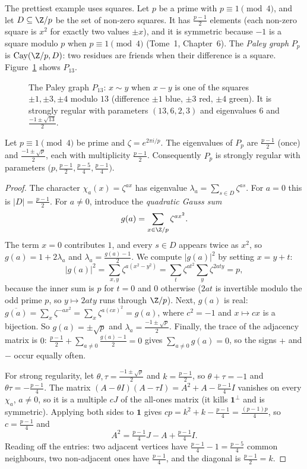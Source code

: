 The prettiest example uses squares. Let $p$ be a prime with $p\equiv1\pmod4$, and let $D\subseteq\Z/p$ be the set of non-zero
squares. It has $\frac{p-1}2$ elements (each non-zero square is $x^2$ for exactly two values $\pm x$), and it is symmetric because
$-1$ is a square modulo $p$ when $p\equiv1\pmod4$ (Tome~1, Chapter~6). The \emph{Paley graph} $P_p$ is $\operatorname{Cay}(\Z/p,D)$:
two residues are friends when their difference is a square. Figure~\ref{fig:paley} shows $P_{13}$.

\begin{figure}[ht]
\centering
{}
\caption{The Paley graph $P_{13}$: $x\sim y$ when $x-y$ is one of the squares $\pm1,\pm3,\pm4$ modulo $13$ (difference $\pm1$ blue,
$\pm3$ red, $\pm4$ green). It is strongly regular with parameters $(13,6,2,3)$ and eigenvalues $6$ and $\frac{-1\pm\sqrt{13}}2$.}
\label{fig:paley}
\end{figure}

\begin{theorem}\label{thm:paley}
Let $p\equiv1\pmod4$ be prime and $\zeta=e^{2\pi i/p}$. The eigenvalues of $P_p$ are $\frac{p-1}2$ (once) and $\frac{-1\pm\sqrt p}2$,
each with multiplicity $\frac{p-1}2$. Consequently $P_p$ is strongly regular with parameters $\bigl(p,\frac{p-1}2,\frac{p-5}4,
\frac{p-1}4\bigr)$.
\end{theorem}
\begin{proof}
The character $\chi_a(x)=\zeta^{ax}$ has eigenvalue $\lambda_a=\sum_{s\in D}\zeta^{as}$. For $a=0$ this is $|D|=\frac{p-1}2$. For
$a\ne0$, introduce the \emph{quadratic Gauss sum}
\[
g(a)=\sum_{x\in\Z/p}\zeta^{ax^2}.
\]
The term $x=0$ contributes $1$, and every $s\in D$ appears twice as $x^2$, so $g(a)=1+2\lambda_a$ and $\lambda_a=\frac{g(a)-1}2$.
We compute $|g(a)|^2$ by setting $x=y+t$:
\[
|g(a)|^2=\sum_{x,y}\zeta^{a(x^2-y^2)}=\sum_t\zeta^{at^2}\sum_y\zeta^{2aty}=p,
\]
because the inner sum is $p$ for $t=0$ and $0$ otherwise ($2at$ is invertible modulo the odd prime $p$, so $y\mapsto2aty$ runs
through $\Z/p$). Next, $g(a)$ is real: $\overline{g(a)}=\sum_x\zeta^{-ax^2}=\sum_x\zeta^{a(cx)^2}=g(a)$, where $c^2=-1$ and
$x\mapsto cx$ is a bijection. So $g(a)=\pm\sqrt p$ and $\lambda_a=\frac{-1\pm\sqrt p}2$. Finally, the trace of the adjacency matrix
is $0$: $\frac{p-1}2+\sum_{a\ne0}\frac{g(a)-1}2=0$ gives $\sum_{a\ne0}g(a)=0$, so the signs $+$ and $-$ occur equally often.

For strong regularity, let $\theta,\tau=\frac{-1\pm\sqrt p}2$ and $k=\frac{p-1}2$, so $\theta+\tau=-1$ and $\theta\tau=-\frac{p-1}4$.
The matrix $(A-\theta I)(A-\tau I)=A^2+A-\frac{p-1}4I$ vanishes on every $\chi_a$, $a\ne0$, so it is a multiple $cJ$ of the
all-ones matrix (it kills $\mathbf 1^\perp$ and is symmetric). Applying both sides to $\mathbf 1$ gives $cp=k^2+k-\frac{p-1}4=
\frac{(p-1)p}4$, so $c=\frac{p-1}4$ and
\[
A^2=\tfrac{p-1}4J-A+\tfrac{p-1}4I.
\]
Reading off the entries: two adjacent vertices have $\frac{p-1}4-1=\frac{p-5}4$ common neighbours, two non-adjacent ones have
$\frac{p-1}4$, and the diagonal is $\frac{p-1}2=k$.
\end{proof}

